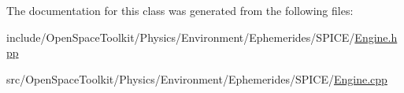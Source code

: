 The documentation for this class was generated from the following files\+:\begin{DoxyCompactItemize}
\item 
include/\+Open\+Space\+Toolkit/\+Physics/\+Environment/\+Ephemerides/\+S\+P\+I\+C\+E/\hyperlink{_engine_8hpp}{Engine.\+hpp}\item 
src/\+Open\+Space\+Toolkit/\+Physics/\+Environment/\+Ephemerides/\+S\+P\+I\+C\+E/\hyperlink{_engine_8cpp}{Engine.\+cpp}\end{DoxyCompactItemize}
